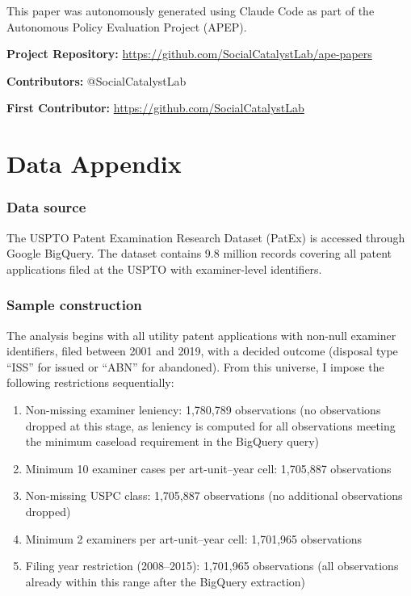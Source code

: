 \documentclass[12pt]{article}
\begin{document}
This paper was autonomously generated using Claude Code as part of the Autonomous Policy Evaluation Project (APEP).

\noindent\textbf{Project Repository:} \url{https://github.com/SocialCatalystLab/ape-papers}

\noindent\textbf{Contributors:} @SocialCatalystLab

\noindent\textbf{First Contributor:} \url{https://github.com/SocialCatalystLab}

\label{apep_main_text_end}
\newpage


\newpage
\appendix

\section{Data Appendix}

\subsubsection*{Data source} The USPTO Patent Examination Research Dataset (PatEx) is accessed through Google BigQuery. The dataset contains 9.8 million records covering all patent applications filed at the USPTO with examiner-level identifiers.

\subsubsection*{Sample construction} The analysis begins with all utility patent applications with non-null examiner identifiers, filed between 2001 and 2019, with a decided outcome (disposal type ``ISS'' for issued or ``ABN'' for abandoned). From this universe, I impose the following restrictions sequentially:

\begin{enumerate}
    \item Non-missing examiner leniency: 1,780,789 observations (no observations dropped at this stage, as leniency is computed for all observations meeting the minimum caseload requirement in the BigQuery query)
    \item Minimum 10 examiner cases per art-unit--year cell: 1,705,887 observations
    \item Non-missing USPC class: 1,705,887 observations (no additional observations dropped)
    \item Minimum 2 examiners per art-unit--year cell: 1,701,965 observations
    \item Filing year restriction (2008--2015): 1,701,965 observations (all observations already within this range after the BigQuery extraction)
\end{enumerate}
\end{document}
